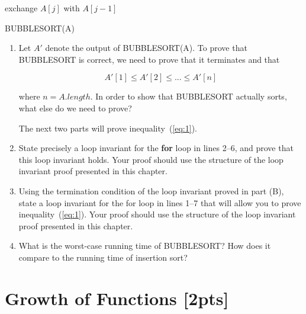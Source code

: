 \documentclass{article}
\begin{document}
\begin{algorithm}[H]
\SetAlgoLined
   {
     {
       {
        exchange $A[j]$ with $A[j-1]$
      }
    }
  }
\caption{BUBBLESORT(A)}
\end{algorithm}

\begin{enumerate}[label=\Alph*]
  \item Let $A'$ denote the output of BUBBLESORT(A). To prove that BUBBLESORT is correct, we need to prove that it terminates and that
  
  \begin{equation} \label{eq:1}
    A'[1] \leq A'[2] \leq ... \leq A'[n]
  \end{equation}
  
  where $n = A.length$. In order to show that BUBBLESORT actually sorts, what else do we need to prove?
  
  The next two parts will prove inequality~(\ref{eq:1}).
  
  \item State precisely a loop invariant for the \textbf{for} loop in lines 2–6, and prove that this loop invariant holds. Your proof should use the structure of the loop invariant proof presented in this chapter.
  
  \item Using the termination condition of the loop invariant proved in part (B), state a loop invariant for the for loop in lines 1–7 that will allow you to prove inequality~(\ref{eq:1}). Your proof should use the structure of the loop invariant proof presented in this chapter.
  
  \item What is the worst-case running time of BUBBLESORT? How does it compare to the running time of insertion sort?
\end{enumerate}


\section{Growth of Functions [2pts]}
\end{document}
